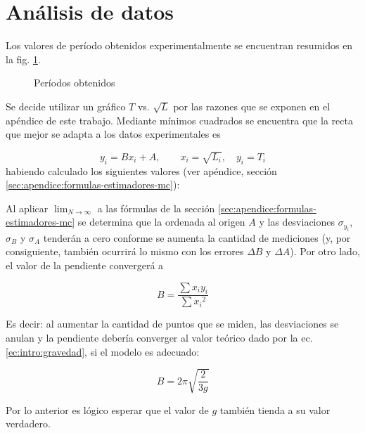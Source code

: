 \section{Análisis de datos}


Los valores de período obtenidos experimentalmente se encuentran resumidos en
la fig. \ref{fig:datos:periodos}.

\begin{figure}[H]
    \centering
    
    \caption{Períodos obtenidos}
    \label{fig:datos:periodos}
\end{figure}

Se decide utilizar un gráfico $T$ vs. $\sqrt{L}$ por las razones que se 
exponen en el apéndice de este trabajo. Mediante mínimos cuadrados se encuentra
que la recta que mejor se adapta a los datos experimentales es

\[
    y_i = Bx_i + A, \quad\quad x_i = \sqrt{L_i}, \quad y_i = T_i
\]
habiendo calculado los siguientes valores (ver apéndice, sección 
\ref{sec:apendice:formulas-estimadores-mc}):

\begin{itemize}
    
\end{itemize}


Al aplicar $\lim_{N\to\infty}$ a las fórmulas de la sección
\ref{sec:apendice:formulas-estimadores-mc} se determina que la ordenada al
origen $A$ y las desviaciones $\sigma_{y_i}$, $\sigma_B$ y $\sigma_A$ tenderán
a cero conforme se aumenta la cantidad de mediciones (y, por consiguiente,
también ocurrirá lo mismo con los errores $\Delta B$ y $\Delta A$). Por otro
lado, el valor de la pendiente convergerá a

\[
    B = \frac{ \sum{x_i y_i} }{ \sum {x_i}^2 }
\]

Es decir: al aumentar la cantidad de puntos que se miden, las desviaciones se
anulan y la pendiente debería converger al valor teórico dado por la ec.
\ref{ec:intro:gravedad}, si el modelo es adecuado:

\[
    B = 2\pi \sqrt{\frac{2}{3g}}
\]

Por lo anterior es lógico esperar que el valor de $g$ también tienda a su valor
verdadero.


